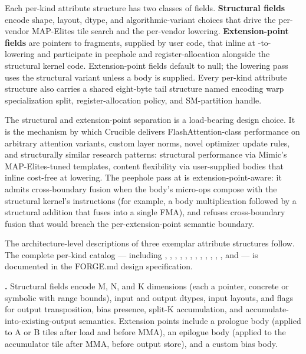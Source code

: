 \begin{property}
\label{prop:ir002-attrs-architecture}
Each per-kind attribute structure has two classes of fields.
\textbf{Structural fields} encode shape, layout, dtype, and algorithmic-variant choices that drive the per-vendor MAP-Elites tile search and the per-vendor lowering.
\textbf{Extension-point fields} are pointers to   fragments, supplied by user code, that inline at -to- lowering and participate in peephole and register-allocation alongside the structural kernel code.
Extension-point fields default to null; the lowering pass uses the structural variant unless a body is supplied.
Every per-kind attribute structure also carries a shared eight-byte tail structure named  encoding warp specialization split, register-allocation policy, and SM-partition handle.
\end{property}

The structural and extension-point separation is a load-bearing design choice.
It is the mechanism by which Crucible delivers FlashAttention-class performance on arbitrary attention variants, custom layer norms, novel optimizer update rules, and structurally similar research patterns: structural performance via Mimic's MAP-Elites-tuned templates, content flexibility via user-supplied bodies that inline cost-free at lowering.
The peephole pass at  is extension-point-aware: it admits cross-boundary fusion when the body's micro-ops compose with the structural kernel's instructions (for example, a body multiplication followed by a structural addition that fuses into a single FMA), and refuses cross-boundary fusion that would breach the per-extension-point semantic boundary.

The architecture-level descriptions of three exemplar attribute structures follow.
The complete per-kind catalog --- including , , , , , , , , , , , , and  --- is documented in the FORGE.md design specification.

\textbf{.}
Structural fields encode M, N, and K dimensions (each a  pointer, concrete or symbolic with range bounds), input and output dtypes, input layouts, and flags for output transposition, bias presence, split-K accumulation, and accumulate-into-existing-output semantics.
Extension points include a prologue body (applied to A or B tiles after load and before MMA), an epilogue body (applied to the accumulator tile after MMA, before output store), and a custom bias body.


